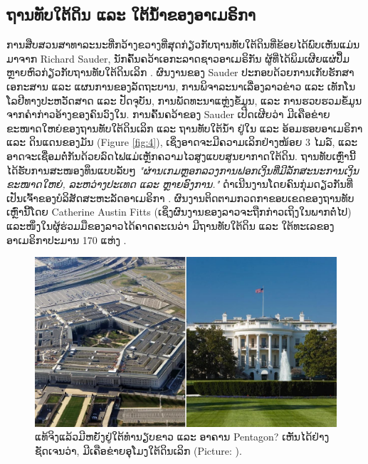 \documentclass[10pt,twocolumn,letterpaper]{article}
\begin{document}
\subsection{ຖານທັບໃຕ້ດິນ ແລະ ໃຕ້ນ້ຳຂອງອາເມຣິກາ}

ການສືບສວນສາທາລະນະທີ່ກວ້າງຂວາງທີ່ສຸດກ່ຽວກັບຖານທັບໃຕ້ດິນທີ່ຂ້ອຍໄດ້ພົບເຫັນແມ່ນມາຈາກ Richard Sauder, ນັກຄົ້ນຄວ້າເອກະລາດຊາວອາເມຣິກັນ ຜູ້ທີ່ໄດ້ພິມເຜີຍແຜ່ປຶ້ມຫຼາຍຫົວກ່ຽວກັບຖານທັບໃຕ້ດິນເລິກ \cite{22}. \cite{111}
ຜົນງານຂອງ Sauder ປະກອບດ້ວຍການເກັບຮັກສາເອກະສານ ແລະ ແຜນການຂອງລັດຖະບານ, ການພິຈາລະນາເລື່ອງລາວຂ່າວ ແລະ ເທັກໂນໂລຢີທາງປະຫວັດສາດ ແລະ ປັດຈຸບັນ, ການພັດທະນາແຫຼ່ງຂໍ້ມູນ, ແລະ ການຮວບຮວມຂໍ້ມູນຈາກຄຳກ່າວອ້າງຂອງຄົນວົງໃນ. \cite{112}
ການຄົ້ນຄວ້າຂອງ Sauder ເປີດເຜີຍວ່າ ມີເຄືອຂ່າຍຂະໜາດໃຫຍ່ຂອງຖານທັບໃຕ້ດິນເລິກ ແລະ ຖານທັບໃຕ້ນ້ຳ ຢູ່ໃນ ແລະ ອ້ອມຮອບອາເມຣິກາ ແລະ ດິນແດນຂອງມັນ (Figure \ref{fig:4}), ເຊິ່ງອາດຈະມີຄວາມເລິກຢ່າງໜ້ອຍ 3 ໄມລ໌, ແລະອາດຈະເຊື່ອມຕໍ່ກັນດ້ວຍລົດໄຟແມ່ເຫຼັກຄວາມໄວສູງແບບສູນຍາກາດໃຕ້ດິນ. \cite{113}
ຖານທັບເຫຼົ່ານີ້ໄດ້ຮັບການສະໜອງທຶນແບບລັບໆ \textit{"ຜ່ານເກມຫຼອກລວງການຟອກເງິນທີ່ມີລັກສະນະການເງິນຂະໜາດໃຫຍ່, ລະຫວ່າງປະເທດ ແລະ ຫຼາຍອົງການ."} ດໍາເນີນງານໂດຍຄົນກຸ່ມດຽວກັນທີ່ເປັນເຈົ້າຂອງບໍລິສັດສະຫະລັດອາເມຣິກາ \cite{22}. ຜົນງານຕິດຕາມກວດກາຂອບເຂດຂອງຖານທັບເຫຼົ່ານີ້ໂດຍ Catherine Austin Fitts  (ເຊິ່ງຜົນງານຂອງລາວຈະຖືກກ່າວເຖິງໃນພາກຕໍ່ໄປ) ແລະໜຶ່ງໃນຜູ້ຮ່ວມມືຂອງລາວໄດ້ຄາດຄະເນວ່າ ມີຖານທັບໃຕ້ດິນ ແລະ ໃຕ້ທະເລຂອງອາເມຣິກາປະມານ 170 ແຫ່ງ \cite{16,20}. \cite{114}
\begin{figure}[b]
\begin{center}
   \includegraphics[width=1\linewidth]{penta.jpg}
\end{center}
   \caption{ແທ້ຈິງແລ້ວມີຫຍັງຢູ່ໃຕ້ທຳນຽບຂາວ ແລະ ອາຄານ Pentagon? ເຫັນໄດ້ຢ່າງຊັດເຈນວ່າ, ມີເຄືອຂ່າຍອຸໂມງໃຕ້ດິນເລິກ  (Picture: \cite{31}). \cite{115}}
\label{fig:3}
\label{fig:onecol}
\end{figure}
\end{document}
